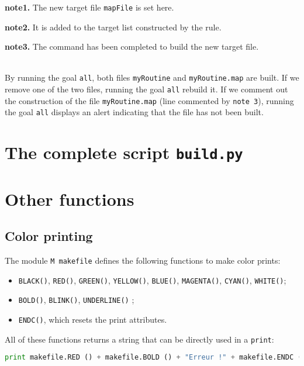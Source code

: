 \documentclass[a4paper,11pt]{extarticle}
\begin{document}
{\bf note1.} The new target file \texttt{mapFile} is set here.

{\bf note2.} It is added to the target list constructed by the rule.

{\bf note3.} The command has been completed to build the new target file.
\\~

By running the goal \texttt{all}, both files \texttt{myRoutine} and \texttt{myRoutine.map} are built. If we remove one of the two files, running the goal \texttt{all} rebuild it. If we comment out the construction of the file \texttt{myRoutine.map}  (line commented by \texttt{note 3}), running the goal \texttt{all} displays an alert indicating that the file has not been built.











\section{The complete script \texttt{build.py}}












\section{Other functions}

\subsection{Color printing}

The module \texttt{M
makefile} defines the following functions to make color prints:
\begin{itemize}
  \item \texttt{BLACK()}, \texttt{RED()}, \texttt{GREEN()}, \texttt{YELLOW()}, \texttt{BLUE()}, \texttt{MAGENTA()}, \texttt{CYAN()}, \texttt{WHITE()};
  \item \texttt{BOLD()}, \texttt{BLINK()}, \texttt{UNDERLINE()} ;
  \item \texttt{ENDC()}, which resets the print attributes.
\end{itemize}
All of these functions returns a string that can be directly used in a \texttt{print}:
\begin{lstlisting}[language=py]
print makefile.RED () + makefile.BOLD () + "Erreur !" + makefile.ENDC ()
\end{lstlisting}
\end{document}
